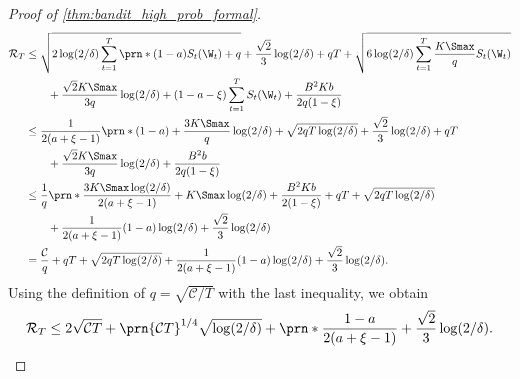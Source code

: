 \begin{proof}[Proof of \cref{thm:bandit_high_prob_formal}]
\begin{align}
    \mathcal{R}_T
    &\leq
    \sqrt{2 \log (2/\delta) \sum_{t=1}^T \prn*{(1-a) S_t(\W_t) + q} }
    +
    \frac{\sqrt{2}}{3} \log (2/\delta)
    +
    q T 
    +
    \sqrt{6 \log (2/\delta) \sum_{t=1}^T \frac{K \Smax}{q} S_t(\W_t) }
    \nonumber \\
    &\qquad
    +
    \frac{\sqrt{2} K \Smax}{3 q} \log(2/\delta) 
    +
    (1 - a - \xi) \sum_{t=1}^T S_t(\W_t)
    +
    \frac{B^2 K b}{2 q (1 - \xi)}
    \nonumber \\
    &\leq
    \frac{1}{2 (a + \xi - 1)}
    \prn*{(1-a) + \frac{3 K \Smax}{q}} \log (2/\delta)
    +
    \sqrt{2 q T \log (2 / \delta)} 
    +
    \frac{\sqrt{2}}{3} \log (2/\delta)
    +
    q T 
    \nonumber \\
    &\qquad
    +
    \frac{\sqrt{2} K \Smax}{3 q} \log(2/\delta) 
    +
    \frac{B^2 b}{2 q (1 - \xi)}
    \nonumber \\
    &\leq
    \frac{1}{q}
    \prn*{
        \frac{3 K \Smax \log (2/\delta)}{2 (a + \xi - 1)}  
        +
        K \Smax \log(2/\delta) 
        +
        \frac{B^2 K b}{2 (1 - \xi)}
    }
    +
    q T 
    +
    \sqrt{2 q T \log (2 / \delta)} 
    \nonumber \\
    &\qquad
    +
    \frac{1}{2 (a + \xi - 1)} (1-a) \log (2/\delta)
    +
    \frac{\sqrt{2}}{3} \log (2/\delta)
    \nonumber \\
    &=
    \frac{\mathcal{C}}{q}
    +
    q T 
    +
    \sqrt{2 q T \log (2 / \delta)} 
    +
    \frac{1}{2 (a + \xi - 1)} (1-a) \log (2/\delta)
    +
    \frac{\sqrt{2}}{3} \log (2/\delta).
    \nonumber
\end{align}
Using the definition of $q = \sqrt{\mathcal{C} / T}$ with the last inequality,
we obtain
\begin{equation}
    \mathcal{R}_T
    \leq
    2
    \sqrt{
        \mathcal{C}
        T
    }
    +
    \prn{\mathcal{C} T}^{1/4} \sqrt{\log (2/ \delta)}
    +
    \prn*{ \frac{1-a}{2 (a + \xi - 1)} + \frac{\sqrt{2}}{3} } \log (2/\delta).
    \nonumber
\end{equation}


\end{proof}
